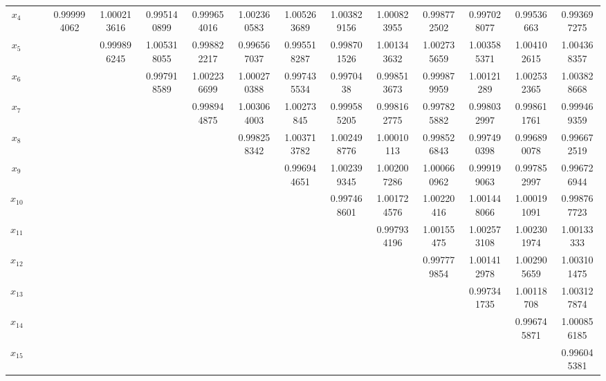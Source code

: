 \documentclass[a4paper]{article}
\begin{document}
\begin{CJK*}{GBK}{song}
\begin{center}
\begin{table*}[!htbp]
{\begin{threeparttable}[!htpb]
\begin{tabular}{ccccc ccccc ccccc}
$x_{4}$	&	&		&	0.999994062	&	1.000213616	&	0.995140899	&	0.999654016	&	1.002360583	&	1.005263689	&	1.003829156	&	1.000823955	&	0.998772502	&	0.997028077	&	0.99536663	&	0.993697275	\\
$x_{5}$	&	&		&		&	0.999896245	&	1.005318055	&	0.998822217	&	0.996567037	&	0.995518287	&	0.998701526	&	1.001343632	&	1.002735659	&	1.003585371	&	1.004102615	&	1.004368357	\\
$x_{6}$	&	&		&		&		&	0.997918589	&	1.002236699	&	1.000270388	&	0.997435534	&	0.9970438	&	0.998513673	&	0.999879959	&	1.00121289	&	1.002532365	&	1.003828668	\\
$x_{7}$	&	&		&		&		&		&	0.998944875	&	1.003064003	&	1.00273845	&	0.999585205	&	0.998162775	&	0.997825882	&	0.998032997	&	0.998611761	&	0.999469359	\\
$x_{8}$	&	&		&		&		&		&		&	0.998258342	&	1.003713782	&	1.002498776	&	1.00010113	&	0.998526843	&	0.997490398	&	0.996890078	&	0.996672519	\\
$x_{9}$	&	&		&		&		&		&		&		&	0.996944651	&	1.002399345	&	1.002007286	&	1.000660962	&	0.999199063	&	0.997852997	&	0.996726944	\\
$x_{10}$&		&		&		&		&		&		&		&		&	0.997468601	&	1.001724576	&	1.00220416	&	1.001448066	&	1.000191091	&	0.998767723	\\
$x_{11}$&		&		&		&		&		&		&		&		&		&	0.997934196	&	1.00155475	&	1.002573108	&	1.002301974	&	1.00133333	\\
$x_{12}$&		&		&		&		&		&		&		&		&		&		&	0.997779854	&	1.001412978	&	1.002905659	&	1.003101475	\\
$x_{13}$&		&		&		&		&		&		&		&		&		&		&		&	0.997341735	&	1.00118708	&	1.003127874	\\
$x_{14}$&		&		&		&		&		&		&		&		&		&		&		&		&	0.996745871	&	1.000856185	\\
$x_{15}$&		&		&		&		&		&		&		&		&		&		&		&		&		&	0.996045381	\\
\bottomrule
\end{tabular}
\end{threeparttable}}%
\end{table*}
\end{center}


\end{CJK*}
\end{document}
